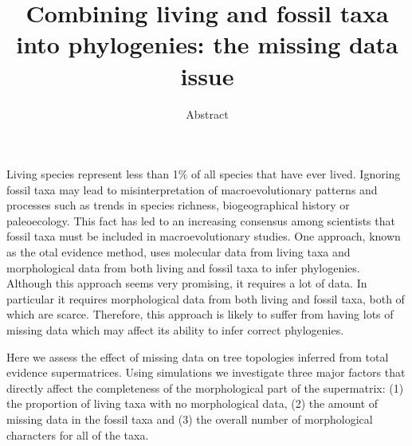 \documentclass{article}
\begin{document}
\title{Combining living and fossil taxa into phylogenies: the missing data issue}
\date{Abstract}

\maketitle


Living species represent less than 1\% of all species that have ever lived. Ignoring fossil taxa may lead to misinterpretation of macroevolutionary patterns and processes such as trends in species richness, biogeographical history or paleoecology. This fact has led to an increasing consensus among scientists that fossil taxa must be included in macroevolutionary studies. One approach, known as the otal evidence method, uses molecular data from living taxa and morphological data from both living and fossil taxa to infer phylogenies. Although this approach seems very promising, it requires a lot of data. In particular it requires morphological data from both living and fossil taxa, both of which are scarce. Therefore, this approach is likely to suffer from having lots of missing data which may affect its ability to infer correct phylogenies.

Here we assess the effect of missing data on tree topologies inferred from total evidence supermatrices. Using simulations we investigate three major factors that directly affect the completeness of the morphological part of the supermatrix: (1) the proportion of living taxa with no morphological data, (2) the amount of missing data in the fossil taxa and (3) the overall number of morphological characters for all of the taxa.
\end{document}
